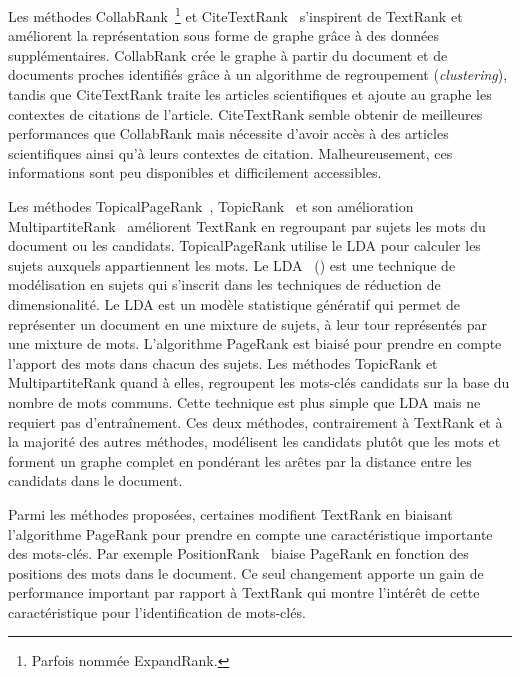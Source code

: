Les méthodes CollabRank~\cite{wan_collabrank:_2008}\footnote{Parfois nommée ExpandRank.} et CiteTextRank~\cite{gollapalli_extracting_2014} s'inspirent de TextRank et améliorent la représentation sous forme de graphe grâce à des données supplémentaires.
CollabRank crée le graphe à partir du document et de documents proches identifiés grâce à un algorithme de regroupement (\textit{clustering}), tandis que CiteTextRank traite les articles scientifiques et ajoute au graphe les contextes de citations de l'article.
CiteTextRank semble obtenir de meilleures performances que CollabRank mais nécessite d'avoir accès à des articles scientifiques ainsi qu'à leurs contextes de citation. Malheureusement, ces informations sont peu disponibles et difficilement accessibles.


Les méthodes TopicalPageRank~\cite{liu_automatic_2010}, TopicRank~\cite{bougouin_topicrank:_2013} et son amélioration MultipartiteRank~\cite{boudin_unsupervised_2018} améliorent TextRank en regroupant par sujets les mots du document ou les candidats.
TopicalPageRank utilise le LDA pour calculer les sujets auxquels appartiennent les mots. Le LDA~\cite{blei_latent_2003} () est une technique de modélisation en sujets qui s'inscrit dans les techniques de réduction de dimensionalité. Le LDA est un modèle statistique génératif qui permet de représenter un document en une mixture de sujets, à leur tour représentés par une mixture de mots.
L'algorithme PageRank est biaisé pour prendre en compte l'apport des mots dans chacun des sujets.
Les méthodes TopicRank et MultipartiteRank quand à elles, regroupent les mots-clés candidats sur la base du nombre de mots communs. Cette technique est plus simple que LDA mais ne requiert pas d'entraînement.
Ces deux méthodes, contrairement à TextRank et à la majorité des autres méthodes, modélisent les candidats plutôt que les mots et forment un graphe complet en pondérant les arêtes par la distance entre les candidats dans le document.


Parmi les méthodes proposées, certaines modifient TextRank en biaisant l'algorithme PageRank pour prendre en compte une caractéristique importante des mots-clés. Par exemple PositionRank~\cite{florescu_positionrank:_2017} biaise PageRank en fonction des positions des mots dans le document.
Ce seul changement apporte un gain de performance important par rapport à TextRank qui montre l'intérêt de cette caractéristique pour l'identification de mots-clés.


